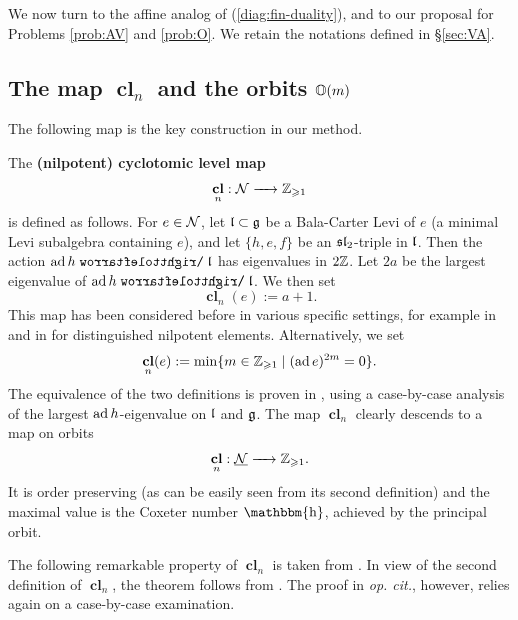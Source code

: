 \documentclass[reqno]{amsart}
\DeclareMathOperator{\Bh}{\mathbbm{h}}
\newcommand{\ubar}[1]{\underline{#1}}
\DeclareMathOperator{\cl}{\mathbf{cl}}
\begin{document}
We now turn to the affine analog of (\ref{diag:fin-duality}), and to our proposal for Problems \ref{prob:AV} and \ref{prob:O}. We retain the notations defined in \S\ref{sec:VA}. 

\subsection{\texorpdfstring{The map $\cl_n$ and the orbits $\mathbb{O}(m)$}{The map cln and the orbits O(m)}}

The following map is the key construction in our method.

\begin{definition}
	The \textbf{(nilpotent) cyclotomic level map}
	\begin{equation*}
		\cl_n: \cN \aro \BZ_{\ge 1}
	\end{equation*}
	is defined as follows. For $e \in \mathcal{N}$, let $\mathfrak{l} \subset \mathfrak{g}$ be a Bala-Carter Levi of $e$ (a minimal Levi subalgebra containing $e$), and let $\{h,e,f\}$ be an $\mathfrak{sl}_2$-triple in $\mathfrak{l}$. Then the action $\ad h \acts \fl$ has eigenvalues in $2\mathbb{Z}$. Let $2a$ be the largest eigenvalue of $\ad h \acts \fl$. We then set
	\begin{equation*}
		\cl_n(e) := a+1.
	\end{equation*}	
	This map has been considered before in various specific settings, for example in \cite[Proposition 9.2]{KL:Fl} and in \cite[\S7.3]{stable-grading} for distinguished nilpotent elements. Alternatively, we set
	\begin{equation*}
		\cl_n(e) := \min\{m \in \BZ_{\ge 1} \mid (\ad e)^{2m} = 0\}.
	\end{equation*}
	The equivalence of the two definitions is proven in \cite[Lemma 2.1.4]{SYZ:cl}, using a case-by-case analysis of the largest $\operatorname{ad} h$-eigenvalue on $\mathfrak{l}$ and $\mathfrak{g}$. The map $\cl_n$ clearly descends to a map on orbits
	\begin{equation*}
		\cl_n: \ubar \cN \aro \BZ_{\ge 1}.
	\end{equation*}
	It is order preserving (as can be easily seen from its second definition) and the maximal value is the Coxeter number $\Bh$, achieved by the principal orbit.
\end{definition}

The following remarkable property of $\cl_n$ is taken from \cite[Theorem 2.1.6]{SYZ:cl}. In view of the second definition of $\cl_n$, the theorem follows from \cite{VIGRE}. The proof in \textit{op. cit.}, however, relies again on a case-by-case examination.
\end{document}

